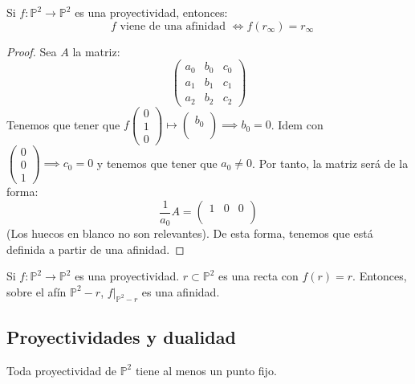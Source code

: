 \begin{nth}
	Si $f: \mathbb P^2 \to \mathbb P^2$ es una proyectividad, entonces:
	\[
	\text{ $f$ viene de una afinidad } \iff f(r_\infty) = r_\infty
	\]
\end{nth}
\begin{proof}
	Sea $A$ la matriz:
	\[
	\begin{pmatrix}
 a_0& b_0 & c_0 \\
 a_1 & b_1 & c_1\\
 a_2 & b_2 & c_2
\end{pmatrix}
	\]
	Tenemos que tener que $f\begin{pmatrix}
0\\
1\\
0
\end{pmatrix} \mapsto \begin{pmatrix}
b_0\\
\\

\end{pmatrix} \implies b_0 = 0 $. Idem con $\begin{pmatrix}
0\\
0\\
1
\end{pmatrix} \implies c_0 = 0 $ y tenemos que tener que $a_0 \ne 0$. Por tanto, la matriz será de la forma:
\[
\dfrac{1}{a_0} A = \begin{pmatrix}
 1& 0 & 0 \\
  &  & \\
  & &
\end{pmatrix}
\]
(Los huecos en blanco no son relevantes). De esta forma, tenemos que está definida a partir de una afinidad.
\end{proof}

\begin{ncor}
	Si $f: \mathbb P^2 \to \mathbb P^2$ es una proyectividad. $r\subset \mathbb P^2$ es una recta con $f(r) = r$.
	Entonces, sobre el afín $\mathbb P^2 -r$, $f|_{\mathbb P^2 -r}$ es una afinidad.
\end{ncor}

\subsection{Proyectividades y dualidad}

\begin{nth}
	Toda proyectividad de $\mathbb P^2$ tiene al menos un punto fijo.
\end{nth}

